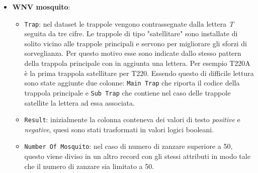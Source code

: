 \begin{itemize}
	
	\item \textbf{WNV mosquito}:
	
	\begin{itemize}
		
		\item \texttt{Trap}: nel dataset le trappole vengono contrassegnate dalla lettera \textit{T} seguita da tre cifre. Le trappole di tipo "satellitare" sono installate di solito vicino alle trappole principali e servono per migliorare gli sforzi di sorveglianza. Per questo motivo esse sono indicate dallo stesso pattern della trappola principale con in aggiunta una lettera. Per esempio T220A è la prima trappola satellitare per T220. Essendo questo di difficile lettura sono state aggiunte due colonne: \texttt{Main Trap} che riporta il codice della trappola principale e \texttt{Sub Trap} che contiene nel caso delle trappole satellite la lettera ad essa associata.
		
		\item \texttt{Result}: inizialmente la colonna conteneva dei valori di testo \textit{positive} e \textit{negative}, quesi sono stati trasformati in valori logici booleani.  
		
		\item \texttt{Number Of Mosquito}: nel caso di numero di zanzare superiore a 50, questo viene diviso in un altro record con gli stessi attributi in modo tale che il numero di zanzare sia limitato a 50.  
			
	\end{itemize}
	
\end{itemize}

